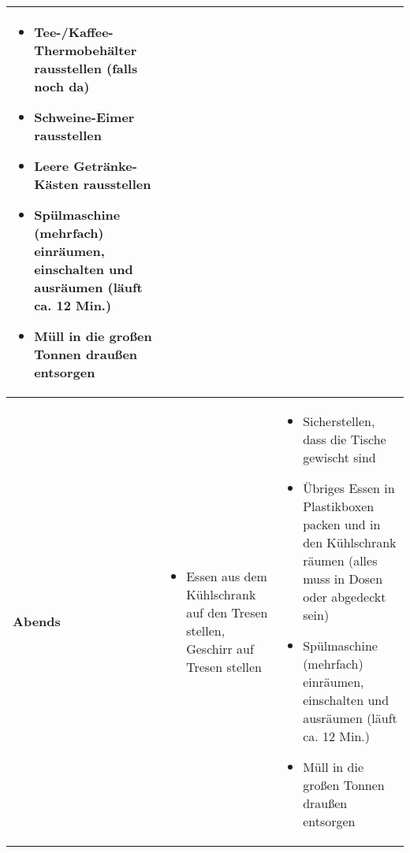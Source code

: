 \documentclass[a4paper,parskip=half]{scrartcl}
\begin{document}
\begin{tabularx}{\textwidth}{l||p{}|X}
\begin{itemize}
			\item Tee-/Kaffee-Thermobehälter rausstellen (falls noch da)
            \item Schweine-Eimer rausstellen
            \item Leere Getränke-Kästen rausstellen
            \item Spülmaschine (mehrfach) einräumen, einschalten und ausräumen (läuft ca. 12 Min.)
            \item Müll in die großen Tonnen draußen entsorgen
        \end{itemize} \\
    \hline
	\newline\textbf{Abends} &
        \begin{itemize}
            \item Essen aus dem Kühlschrank auf den Tresen stellen, Geschirr auf Tresen stellen
        \end{itemize} &
        \begin{itemize}
            \item Sicherstellen, dass die Tische gewischt sind
            \item Übriges Essen in Plastikboxen packen und in den Kühlschrank räumen (alles muss in Dosen oder abgedeckt sein)
            \item Spülmaschine (mehrfach) einräumen, einschalten und ausräumen (läuft ca. 12 Min.)
            \item Müll in die großen Tonnen draußen entsorgen
        \end{itemize} \\
\end{tabularx}
\end{document}
